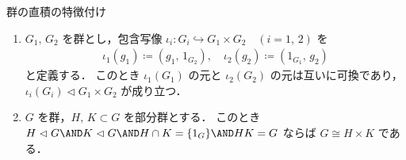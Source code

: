 \documentclass[geometry_main]{subfiles}
\begin{document}
\begin{myprop}[label=prop:prod-group]{群の直積の特徴付け}
	\begin{enumerate}
		\item $G_1,\, G_2$ を群とし，包含写像 $\iota_i \colon G_i \hookrightarrow G_1 \times G_2\quad (i = 1,\, 2)$ を
		\begin{align}
			\iota_1(g_1) \coloneqq (g_1,\, 1_{G_2}),\quad \iota_2(g_2) \coloneqq (1_{G_1},\, g_2)
		\end{align}
		と定義する．
		このとき $\iota_1(G_1)$ の元と $\iota_2(G_2)$ の元は互いに可換であり，$\iota_i(G_i) \vartriangleleft G_1 \times G_2$ が成り立つ．
		\item $G$ を群，$H,\, K \subset G$ を部分群とする．
		このとき $H \vartriangleleft G \AND K \vartriangleleft G \AND H \cap K = \{1_G\} \AND HK = G$ ならば $G \cong H \times K$ である．
	\end{enumerate}
\end{myprop}
\end{document}

